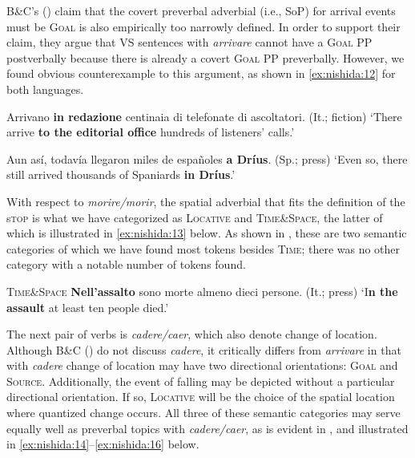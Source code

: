 \documentclass[output=paper,colorlinks,citecolor=brown,
]{langscibook}
\begin{document}
B\&C's (\citeyear{bentley2018silent}) claim that the covert preverbal adverbial (i.e., SoP) for arrival events must be \textsc{Goal} is also empirically too narrowly defined. In order to support their claim, they argue that VS sentences with \textit{arrivare} cannot have a \textsc{Goal} PP postverbally because there is already a covert \textsc{Goal} PP preverbally. However, we found obvious counterexample to this argument, as shown in \ref{ex:nishida:12} for both languages. 


\begin{exe} %
    \ex\label{ex:nishida:12} 
    \begin{xlist}
\ex\label{ex:nishida:12a}  Arrivano \textbf{in redazione} centinaia di telefonate di ascoltatori.	(It.; fiction)
\glt `There arrive \textbf{to the editorial office} hundreds of listeners' calls.' 

\ex\label{ex:nishida:12b} Aun así, todavía llegaron miles de españoles \textbf{a Dríus}.  (Sp.; press) 
\glt `Even so, there still arrived thousands of Spaniards \textbf{in Dríus}.'  
    \end{xlist}
\end{exe}

With respect to \textit{morire/morir}, the spatial adverbial that fits the definition of the s\textsc{top} is what we have categorized as \textsc{Locative} and \textsc{Time\&Space}, the latter of which is illustrated in \ref{ex:nishida:13} below. As shown in , these are two semantic categories of which we have found most tokens besides \textsc{Time}; there was no other category with a notable number of tokens found.

\begin{exe}
    \ex\label{ex:nishida:13}
    \textsc{Time\&Space} \quad	\textbf{Nell'assalto} sono morte almeno dieci persone. (It.; press)
    \glt `I\textbf{n the assault} at least ten people died.'
\end{exe}

The next pair of verbs is \textit{cadere/caer}, which also denote change of location. Although B\&C (\citeyear{bentley2018silent}) do not discuss \textit{cadere}, it critically differs from \textit{arrivare} in that with \textit{cadere} change of location may have two directional orientations: \textsc{Goal} and \textsc{Source}. Additionally, the event of falling may be depicted without a particular directional orientation. If so, \textsc{Locative} will be the choice of the spatial location where quantized change occurs. All three of these semantic categories may serve equally well as preverbal topics with \textit{cadere/caer}, as is evident in , and illustrated in \ref{ex:nishida:14}--\ref{ex:nishida:16} below. 
\end{document}
